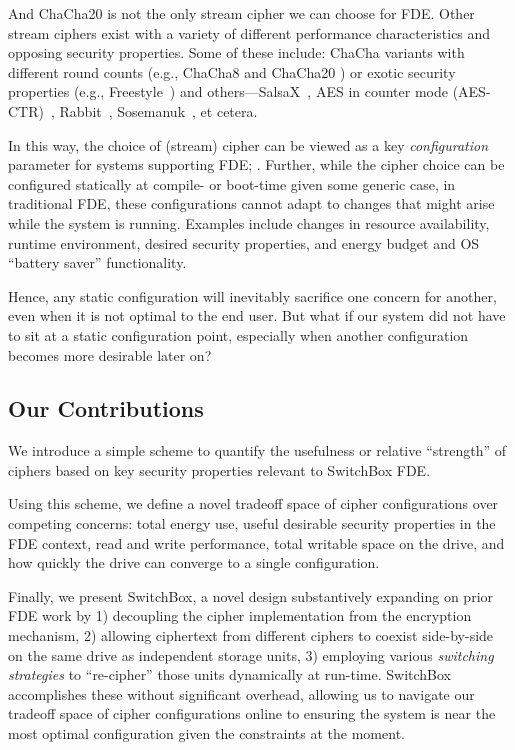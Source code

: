 And ChaCha20 is not the only stream cipher we can choose for FDE. Other stream
ciphers exist with a variety of different performance characteristics and
opposing security properties. Some of these include: ChaCha variants with
different round counts (e.g., ChaCha8 \cite{ChaCha8} and ChaCha20
\cite{ChaCha20}) or exotic security properties (e.g.,
Freestyle~\cite{Freestyle}) and others---SalsaX~\cite{SalsaX}, AES in counter
mode (AES-CTR)~\cite{AES-CTR}, Rabbit~\cite{Rabbit}, Sosemanuk~\cite{Sosemanuk},
et cetera.

In this way, the choice of (stream) cipher can be viewed as a key
\emph{configuration} parameter for systems supporting FDE; . Further, while the cipher choice can be configured
statically at compile- or boot-time given some generic case, in traditional FDE,
these configurations cannot adapt to changes that might arise while the system
is running. Examples include changes in resource availability, runtime
environment, desired security properties, and energy budget and OS ``battery
saver'' functionality.

Hence, any static configuration will inevitably sacrifice one concern for
another, even when it is not optimal to the end user. But what if our system did
not have to sit at a static configuration point, especially when another
configuration becomes more desirable later on?

\subsection{Our Contributions}

We introduce a simple scheme to quantify the usefulness or relative ``strength''
of ciphers based on key security properties relevant to SwitchBox FDE.

Using this scheme, we define a novel tradeoff space of cipher configurations
over competing concerns: total energy use, useful desirable security properties
in the FDE context, read and write performance, total writable space on the
drive, and how quickly the drive can converge to a single configuration.

Finally, we present SwitchBox, a novel design substantively expanding on prior
FDE work by 1) decoupling the cipher implementation from the encryption mechanism,
2) allowing ciphertext from different ciphers to coexist side-by-side on the
same drive as independent storage units, 3) employing various \emph{switching
strategies} to ``re-cipher'' those units dynamically at run-time. SwitchBox
accomplishes these without significant overhead, allowing us to navigate our
tradeoff space of cipher configurations online to ensuring the system is near
the most optimal configuration given the constraints at the moment.



